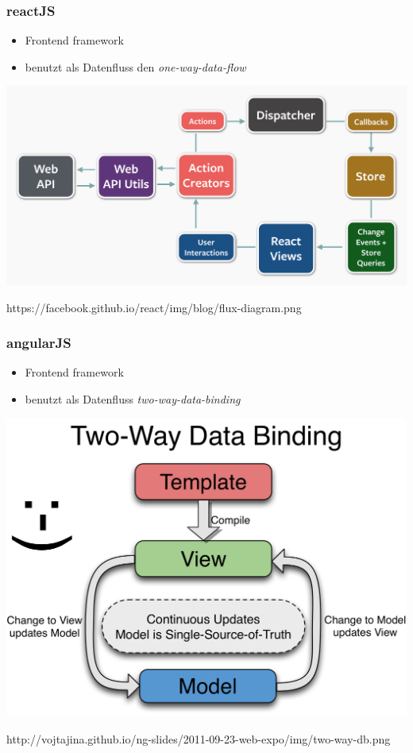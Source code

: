 \documentclass{beamer}
\begin{document}

\begin{frame}
\frametitle{reactJS}
\begin{itemize}
\item Frontend framework
\item benutzt als Datenfluss den \textit{one-way-data-flow}
\end{itemize}
\includegraphics[scale=0.22]{assets/flux.png}

{\tiny https://facebook.github.io/react/img/blog/flux-diagram.png}
\end{frame}


\begin{frame}
\frametitle{angularJS}
\begin{itemize}
\item Frontend framework
\item benutzt als Datenfluss \textit{two-way-data-binding}
\end{itemize}
\includegraphics[scale=0.5]{assets/two-way-db.png}

{\tiny http://vojtajina.github.io/ng-slides/2011-09-23-web-expo/img/two-way-db.png}
\end{frame}
\end{document}
